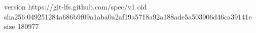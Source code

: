 version https://git-lfs.github.com/spec/v1
oid sha256:049251284a686b9f09a1aba0a2af19a5718a92a188ade5a503906d46ca39141e
size 180977
